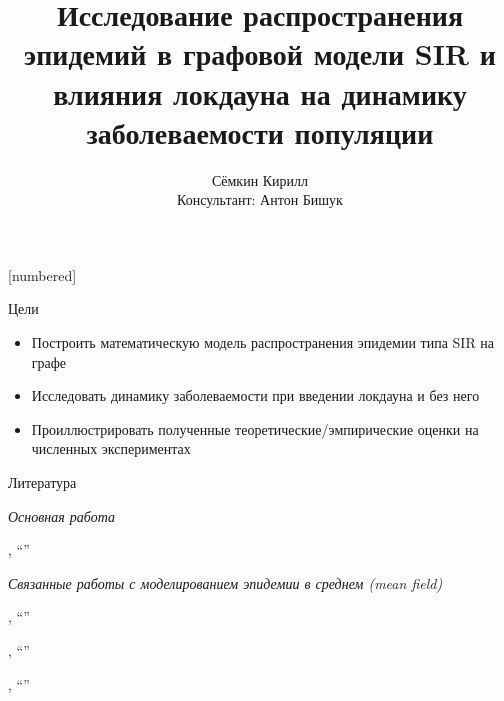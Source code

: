 
\usepackage[backend=biber]{biblatex}
\usepackage{usebib}
\usepackage[justification=centering, font=footnotesize]{caption}
[numbered]



\author{Сёмкин Кирилл \\ Консультант: Антон Бишук}
\date{}
\title{Исследование распространения эпидемий в графовой модели SIR и влияния локдауна на динамику заболеваемости популяции}

\newcommand{\prob}{\ensuremath{\mathbb{P}}}
\newcommand{\matwait}{\ensuremath{\mathbb{E}}}


	
	\begin{frame}[c]
		\titlepage
	\end{frame}

	\begin{frame}{Цели}
		
		\begin{itemize}
			\item Построить математическую модель распространения эпидемии типа SIR на графе
			\item Исследовать динамику заболеваемости при введении локдауна и без него
			\item Проиллюстрировать полученные теоретические/эмпирические оценки на численных экспериментах
		\end{itemize}
	
	\end{frame}

	\begin{frame}{Литература}
		
	{\large \textit{Основная работа}} \medskip
	
	\citeauthor{base_article}, ``\textit{}'' \bigskip
	
	{\large \textit{Связанные работы с моделированием эпидемии в среднем (mean field)}} \medskip
	
	\citeauthor{moreno2002epidemic}, ``\textit{}''
	
	\citeauthor{gomez2010discrete}, ``\textit{}''
	
	\citeauthor{pastor2015epidemic}, ``\textit{}''
		
	\end{frame}

